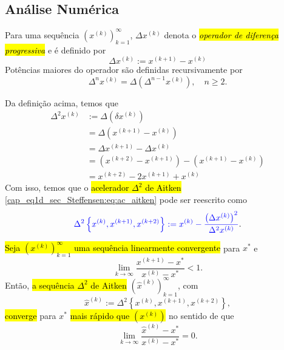 \subsection{Análise Numérica}

\begin{defn}
  Para uma sequência $\left(x^{(k)}\right)_{k=1}^\infty$, $\Delta x^{(k)}$ denota o \hl{\emph{operador de diferença progressiva}} e é definido por
  \begin{equation}
    \Delta x^{(k)} := x^{(k+1)} - x^{(k)}
  \end{equation}
  Potências maiores do operador são definidas recursivamente por
  \begin{equation}
    \Delta^n x^{(k)} = \Delta\left(\Delta^{n-1}x^{(k)}\right),\quad n\geq 2.
  \end{equation}
\end{defn}

Da definição acima, temos que
\begin{align}
  \Delta^2 x^{(k)} &:= \Delta\left(\delta x^{(k)}\right)\\
                   &= \Delta\left(x^{(k+1)} - x^{(k)}\right)\\
                   &= \Delta x^{(k+1)} - \Delta x^{(k)}\\
                   &= \left(x^{(k+2)} - x^{(k+1)}\right) - \left(x^{(k+1)} - x^{(k)}\right)\\
                   &= x^{(k+2)} - 2x^{(k+1)} + x^{(k)}
\end{align}
Com isso, temos que o \hl{acelerador $\Delta^2$ de Aitken} \eqref{cap_eq1d_sec_Steffensen:eq:ac_aitken} pode ser reescrito como
\begin{equation}
  {\color{blue}\Delta^2\left\{x^{(k)}, x^{(k+1)}, x^{(k+2)}\right\} := x^{(k)} - \frac{\left(\Delta x^{(k)}\right)^2}{\Delta^2 x^{(k)}}}.
\end{equation}

\begin{teo}
  \hl{Seja $\left(x^{(k)}\right)_{k=1}^\infty$ uma sequência linearmente convergente} para $x^*$ e
  \begin{equation}\label{cap_eq1d_sec_Steffensen:eq:teo_aux}
    \lim_{k\to\infty}\frac{x^{(k+1)}-x^*}{x^{(k)}-x^*} < 1.
  \end{equation}
  Então, \hl{a sequência $\Delta^2$ de Aitken} $\left(\hat{x}^{(k)}\right)_{k=1}^\infty$, com
  \begin{equation}
    \hat{x}^{(k)} := \Delta^2\left\{x^{(k)}, x^{(k+1)}, x^{(k+2)}\right\},
  \end{equation}
  \hl{converge} para $x^*$ \hl{mais rápido que $\left(x^{(k)}\right)$} no sentido de que
  \begin{equation}
    \lim_{k\to\infty}\frac{\hat{x}^{(k)}-x^*}{x^{(k)}-x^*} = 0.
  \end{equation}
\end{teo}
\begin{dem}
  \emconstrucao
\end{dem}

